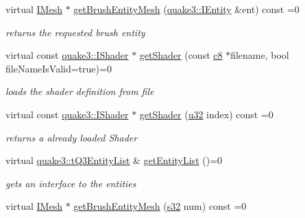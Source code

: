 \begin{DoxyCompactItemize}
\mbox{\label{classirr_1_1scene_1_1IQ3LevelMesh_a31276c90be36a1c7c5b8e87433dd5f63}} 
virtual \hyperlink{classirr_1_1scene_1_1IMesh}{I\+Mesh} $\ast$ \hyperlink{classirr_1_1scene_1_1IQ3LevelMesh_a31276c90be36a1c7c5b8e87433dd5f63}{get\+Brush\+Entity\+Mesh} (\hyperlink{structirr_1_1scene_1_1quake3_1_1IShader}{quake3\+::\+I\+Entity} \&ent) const =0
\begin{DoxyCompactList}\small\item\em returns the requested brush entity \end{DoxyCompactList}\item 
virtual const \hyperlink{structirr_1_1scene_1_1quake3_1_1IShader}{quake3\+::\+I\+Shader} $\ast$ \hyperlink{classirr_1_1scene_1_1IQ3LevelMesh_aa2f9609e950e32876665d7531a54a484}{get\+Shader} (const \hyperlink{namespaceirr_a9395eaea339bcb546b319e9c96bf7410}{c8} $\ast$filename, bool file\+Name\+Is\+Valid=true)=0
\begin{DoxyCompactList}\small\item\em loads the shader definition from file \end{DoxyCompactList}\item 
\mbox{\label{classirr_1_1scene_1_1IQ3LevelMesh_a71c4481a2c9b0a99210ed7d4b8a8fc20}} 
virtual const \hyperlink{structirr_1_1scene_1_1quake3_1_1IShader}{quake3\+::\+I\+Shader} $\ast$ \hyperlink{classirr_1_1scene_1_1IQ3LevelMesh_a71c4481a2c9b0a99210ed7d4b8a8fc20}{get\+Shader} (\hyperlink{namespaceirr_a0416a53257075833e7002efd0a18e804}{u32} index) const =0
\begin{DoxyCompactList}\small\item\em returns a already loaded Shader \end{DoxyCompactList}\item 
\mbox{\label{classirr_1_1scene_1_1IQ3LevelMesh_a6e95f072e7bfe1d96a587ed3c27eedfc}} 
virtual \hyperlink{classirr_1_1core_1_1array}{quake3\+::t\+Q3\+Entity\+List} \& \hyperlink{classirr_1_1scene_1_1IQ3LevelMesh_a6e95f072e7bfe1d96a587ed3c27eedfc}{get\+Entity\+List} ()=0
\begin{DoxyCompactList}\small\item\em get\textquotesingle{}s an interface to the entities \end{DoxyCompactList}\item 
virtual \hyperlink{classirr_1_1scene_1_1IMesh}{I\+Mesh} $\ast$ \hyperlink{classirr_1_1scene_1_1IQ3LevelMesh_ad0ed15c97e55ffb02d1d48fb62a769d5}{get\+Brush\+Entity\+Mesh} (\hyperlink{namespaceirr_ac66849b7a6ed16e30ebede579f9b47c6}{s32} num) const =0

\end{DoxyCompactItemize}
